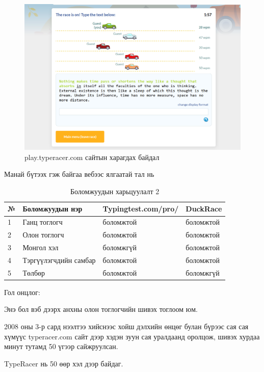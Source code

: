 \begin{figure}[h]
	\centering
	\includegraphics[width=15cm]{images/TypeRacer.png}
	\caption{play.typeracer.com сайтын харагдах байдал}
	\label{fig:linktree}
\end{figure}

Манай бүтээх гэж байгаа вебээс ялгаатай тал нь
\begin{table}[h]
	\caption{Боломжуудын харьцуулалт 2}
	\begin{tabular}{|l|l|l|p{8cm}|}
		\hline
		№ & Боломжуудын нэр       & Typingtest.com/pro/ & DuckRace  \\ \hline
		1 & Ганц тоглогч          & боломжтой           & боломжтой \\ \hline
		2 & Олон тоглогч          & боломжтой           & боломжтой \\ \hline
		3 & Монгол хэл            & боломжгүй           & боломжтой \\ \hline
		4 & Тэргүүлэгчдийн самбар & боломжтой           & боломжтой \\ \hline
		5 & Төлбөр                & боломжтой           & боломжгүй \\ \hline
	\end{tabular}
\end{table}

Гол онцлог:

Энэ бол вэб дээрх анхны олон тоглогчийн шивэх тоглоом юм.

2008 оны 3-р сард нээлтээ хийснээс хойш дэлхийн өнцөг булан бүрээс сая сая хүмүүс typeracer.com сайт дээр хэдэн зуун сая уралдаанд оролцож, шивэх хурдаа минут тутамд 50 үгээр сайжруулсан.

TypeRacer нь 50 өөр хэл дээр байдаг.

